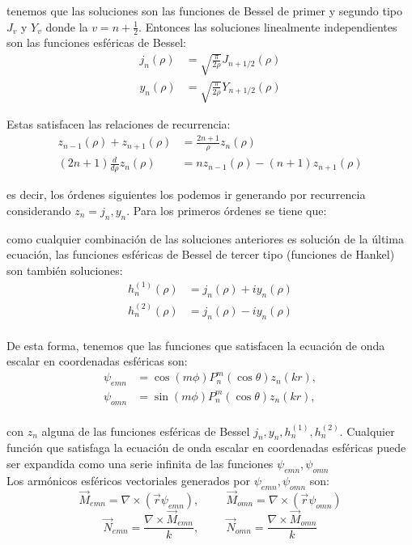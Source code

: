 tenemos que las soluciones son las funciones de Bessel de primer y segundo tipo $J_v$ y $Y_v$ donde la $v=n+\frac{1}{2}$. Entonces las soluciones linealmente independientes son las funciones esféricas de Bessel:
\begin{align}
    j_n(\rho)&=\sqrt{\frac{\pi}{2\rho}}J_{n+1/2}(\rho)\\
    y_n(\rho)&=\sqrt{\frac{\pi}{2\rho}}Y_{n+1/2}(\rho)
\end{align}

Estas satisfacen las relaciones de recurrencia:
\begin{align}
    z_{n-1}(\rho)+z_{n+1}(\rho)&=\frac{2n+1}{\rho}z_n(\rho)\\
    (2n+1)\frac{d}{d\rho}z_n(\rho)&=nz_{n-1}(\rho)-(n+1)z_{n+1}(\rho)
\end{align}


es decir, los órdenes siguientes los podemos ir generando por recurrencia considerando $z_n=j_n,y_n$. Para los primeros órdenes se tiene que:


como cualquier combinación de las soluciones anteriores es solución de la última ecuación, las funciones esféricas de Bessel de tercer tipo (funciones de Hankel) son también soluciones:
\begin{align}
    h_n^{(1)}(\rho)&=j_n(\rho)+iy_n(\rho)\\
    h_n^{(2)}(\rho)&=j_n(\rho)-iy_n(\rho)\\
\end{align}

De esta forma, tenemos que las funciones que satisfacen la ecuación de onda escalar en coordenadas esféricas son:
\begin{align}
    \psi_{emn}&=\cos (m\phi)P_n^m(\cos\theta)z_n(kr),\\
    \psi_{omn}&=\sin(m\phi)P_n^m(\cos\theta)z_n(kr),\\
\end{align}

con $z_n$ alguna de las funciones esféricas de Bessel $j_n,y_n,h_n^{(1)},h_n^{(2)}$. Cualquier función que satisfaga la ecuación de onda escalar en coordenadas esféricas puede ser expandida como una serie infinita de las funciones $\psi_{emn},\psi_{omn}$ \\

Los armónicos esféricos vectoriales generados por $\psi_{emn},\psi_{omn}$ son:
$$\Vec{M}_{emn}=\nabla\times(\Vec{r}\psi_{emn}),\hspace{1cm}\Vec{M}_{omn}=\nabla\times(\Vec{r}\psi_{omn})$$
$$\Vec{N}_{emn}=\frac{\nabla\times\Vec{M}_{emn}}{k},\hspace{1cm}\Vec{N}_{omn}=\frac{\nabla\times\Vec{M}_{omn}}{k}$$

